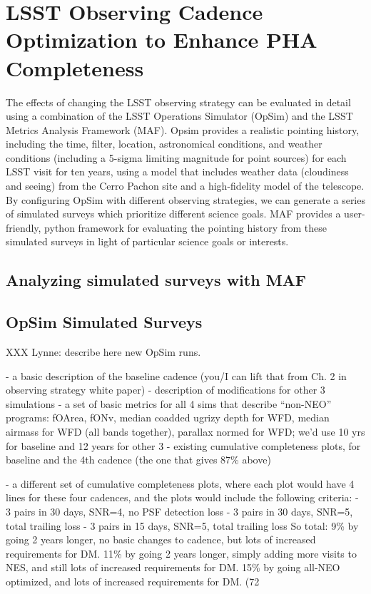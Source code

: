 \section{LSST Observing Cadence Optimization to Enhance PHA Completeness}

The effects of changing the LSST observing strategy can be evaluated in detail using a combination of the LSST Operations Simulator (OpSim) and the LSST Metrics Analysis Framework (MAF). Opsim provides a realistic pointing history, including the time, filter, location, astronomical conditions, and weather conditions (including a 5-sigma limiting magnitude for point sources) for each LSST visit for ten years, using a model that includes weather data (cloudiness and seeing) from the Cerro Pachon site and a high-fidelity model of the telescope. By configuring OpSim with different observing strategies, we can generate a series of simulated surveys which prioritize different science goals. MAF provides a user-friendly, python framework for evaluating the pointing history from these simulated surveys in light of particular science goals or interests.

\subsection{Analyzing simulated surveys with MAF}



\subsection{OpSim Simulated Surveys}




XXX Lynne: describe here new OpSim runs.  

- a basic description of the baseline cadence (you/I can lift that from 
  Ch. 2 in observing strategy white paper) 
- description of modifications for other 3 simulations 
- a set of basic metrics for all 4 sims that describe “non-NEO” programs: 
   fOArea, fONv, median coadded ugrizy depth for WFD, median airmass 
   for WFD (all bands together), parallax normed for WFD; we’d use 10 yrs
   for baseline and 12 years for other 3 
- existing cumulative completeness plots, for baseline and the 4th cadence
   (the one that gives 87\% above)
        
- a different set of cumulative completeness plots, where each plot would 
   have 4 lines for these four cadences, and the plots would include the
   following criteria:
       - 3 pairs in 30 days, SNR=4, no PSF detection loss
       - 3 pairs in 30 days, SNR=5, total trailing loss
       - 3 pairs in 15 days, SNR=5, total trailing loss
So total: 
9\% by going 2 years longer, no basic changes to cadence, but lots of increased requirements for DM. 
11\% by going 2 years longer, simply adding more visits to NES, and still lots of increased requirements for DM. 
15\% by going all-NEO optimized, and lots of increased requirements for DM. (72%





